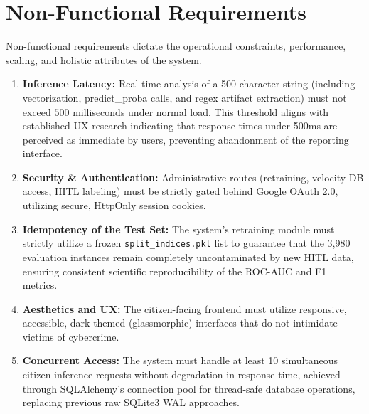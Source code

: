 \section{Non-Functional Requirements}
Non-functional requirements dictate the operational constraints, performance, scaling, and holistic attributes of the system.
\begin{enumerate}
    \item \textbf{Inference Latency:} Real-time analysis of a 500-character string (including vectorization, predict\_proba calls, and regex artifact extraction) must not exceed $500$ milliseconds under normal load. This threshold aligns with established UX research indicating that response times under 500ms are perceived as immediate by users, preventing abandonment of the reporting interface.
    \item \textbf{Security \& Authentication:} Administrative routes (retraining, velocity DB access, HITL labeling) must be strictly gated behind Google OAuth 2.0, utilizing secure, HttpOnly session cookies.
    \item \textbf{Idempotency of the Test Set:} The system's retraining module must strictly utilize a frozen \texttt{split\_indices.pkl} list to guarantee that the 3,980 evaluation instances remain completely uncontaminated by new HITL data, ensuring consistent scientific reproducibility of the ROC-AUC and F1 metrics.
    \item \textbf{Aesthetics and UX:} The citizen-facing frontend must utilize responsive, accessible, dark-themed (glassmorphic) interfaces that do not intimidate victims of cybercrime.
    \item \textbf{Concurrent Access:} The system must handle at least 10 simultaneous citizen inference requests without degradation in response time, achieved through SQLAlchemy's connection pool for thread-safe database operations, replacing previous raw SQLite3 WAL approaches.
\end{enumerate}
